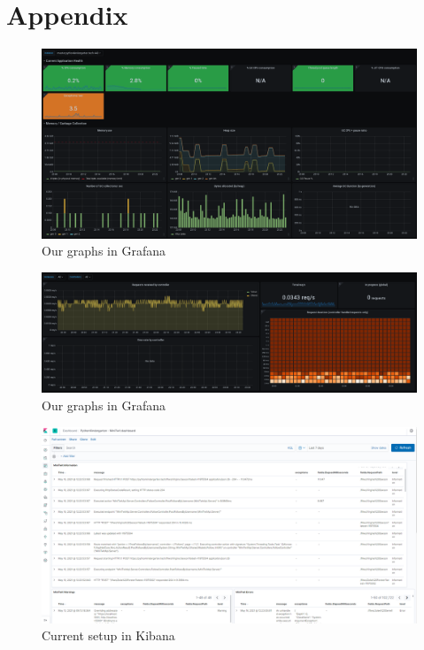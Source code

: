 \documentclass{article}
\begin{document}
\newpage

\section{Appendix}
\begin{figure}[h!]
    \centering
    \includegraphics[scale=0.2]{images/grafana_1.png}
    \caption{ Our graphs in Grafana }
\end{figure}

\begin{figure}[h!]
    \centering
    \includegraphics[scale=0.2]{images/grafana_2.png}
    \caption{ Our graphs in Grafana }
\end{figure}

\begin{figure}[h!]
    \centering
    \includegraphics[scale=0.2]{images/kibana_1.png}
    \caption{ Current setup in Kibana }
\end{figure}
\end{document}
